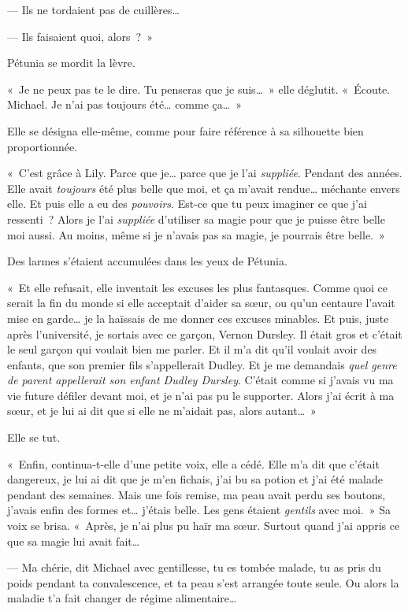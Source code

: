 --- Ils ne tordaient pas de cuillères…

--- Ils faisaient quoi, alors~?~»

Pétunia se mordit la lèvre.

«~Je ne peux pas te le dire. Tu penseras que je suis…~» elle déglutit. «~Écoute. Michael. Je n'ai pas toujours été… comme ça…~»

Elle se désigna elle-même, comme pour faire référence à sa silhouette bien proportionnée.

«~C'est grâce à Lily. Parce que je… parce que je l'ai \emph{suppliée}. Pendant des années. Elle avait \emph{toujours} été plus belle que moi, et ça m'avait rendue… méchante envers elle. Et puis elle a eu des \emph{pouvoirs}. Est-ce que tu peux imaginer ce que j'ai ressenti~? Alors je l'ai \emph{suppliée} d'utiliser sa magie pour que je puisse être belle moi aussi. Au moins, même si je n'avais pas sa magie, je pourrais être belle.~»

Des larmes s'étaient accumulées dans les yeux de Pétunia.

«~Et elle refusait, elle inventait les excuses les plus fantasques. Comme quoi ce serait la fin du monde si elle acceptait d'aider sa sœur, ou qu'un centaure l'avait mise en garde… je la haïssais de me donner ces excuses minables. Et puis, juste après l'université, je sortais avec ce garçon, Vernon Dursley. Il était gros et c'était le seul garçon qui voulait bien me parler. Et il m'a dit qu'il voulait avoir des enfants, que son premier fils s'appellerait Dudley. Et je me demandais \emph{quel genre de parent appellerait son enfant Dudley Dursley}. C'était comme si j'avais vu ma vie future défiler devant moi, et je n'ai pas pu le supporter. Alors j'ai écrit à ma sœur, et je lui ai dit que si elle ne m'aidait pas, alors autant…~»

Elle se tut.

«~Enfin, continua-t-elle d'une petite voix, elle a cédé. Elle m'a dit que c'était dangereux, je lui ai dit que je m'en fichais, j'ai bu sa potion et j'ai été malade pendant des semaines. Mais une fois remise, ma peau avait perdu ses boutons, j'avais enfin des formes et… j'étais belle. Les gens étaient \emph{gentils} avec moi.~» Sa voix se brisa. «~Après, je n'ai plus pu haïr ma sœur. Surtout quand j'ai appris ce que sa magie lui avait fait…

--- Ma chérie, dit Michael avec gentillesse, tu es tombée malade, tu as pris du poids pendant ta convalescence, et ta peau s'est arrangée toute seule. Ou alors la maladie t'a fait changer de régime alimentaire…

